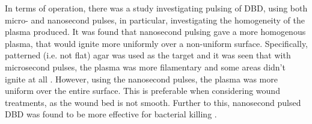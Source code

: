 \documentclass[11pt, oneside]{article}   	%
\begin{document}

In terms of operation, there was a study investigating pulsing of DBD, using both micro- and nanosecond pulses, in particular, investigating the homogeneity of the plasma produced. 
It was found that nanosecond pulsing gave a more homogenous plasma, that would ignite more uniformly over a non-uniform surface.
Specifically, patterned (i.e. not flat) agar was used as the target and it was seen that with microsecond pulses, the plasma was more filamentary and some areas didn't ignite at all \cite{Ayan2009application}. 
However, using the nanosecond pulses, the plasma was more uniform over the entire surface.
This is preferable when considering wound treatments, as the wound bed is not smooth.
Further to this, nanosecond pulsed DBD was found to be more effective for bacterial killing \cite{Ayan2008nanosecond}.

%


\scriptsize


\end{document}
